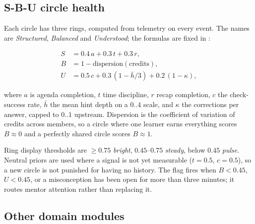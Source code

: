\subsection{S-B-U circle health}
\label{sec:sbu}

Each circle has three rings, computed from telemetry on every event. The names are
\emph{Structured}, \emph{Balanced} and \emph{Understood}; the formulas are fixed in
:

\begin{align}
S &= 0.4\,a + 0.3\,t + 0.3\,r, \label{eq:s}\\
B &= 1 - \mathrm{dispersion}(\text{credits}), \label{eq:b}\\
U &= 0.5\,c + 0.3\,(1 - \bar{h}/3) + 0.2\,(1 - \kappa), \label{eq:u}
\end{align}

where $a$ is agenda completion, $t$ time discipline, $r$ recap completion, $c$ the
check-success rate, $\bar h$ the mean hint depth on a $0..4$ scale, and $\kappa$ the
corrections per answer, capped to $0..1$ upstream. Dispersion is the coefficient of
variation of credits across members, so a circle where one learner earns everything scores
$B \approx 0$ and a perfectly shared circle scores $B \approx 1$.

Ring display thresholds are $\ge 0.75$ \emph{bright}, $0.45$--$0.75$ \emph{steady}, below
$0.45$ \emph{pulse}. Neutral priors are used where a signal is not yet measurable
($t = 0.5$, $c = 0.5$), so a new circle is not punished for having no history. The
 flag fires when $B < 0.45$, $U < 0.45$, or a misconception has been
open for more than three minutes; it routes mentor attention rather than replacing it.

\subsection{Other domain modules}

